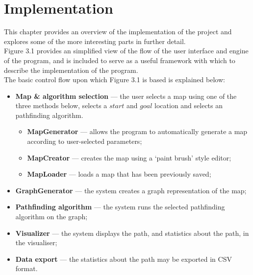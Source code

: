 \documentclass[12pt,notitlepage]{report}
\begin{document}
\chapter{Implementation}

This chapter provides an overview of the implementation of the project and explores some of the more interesting parts in further detail.\\

\noindent
Figure 3.1 provides an simplified view of the flow of the user interface and engine of the program, and is included to serve as a useful framework with which to describe the implementation of the program.\\

\noindent
The basic control flow upon which Figure 3.1 is based is explained below:
\begin{itemize}
\item {\bfseries Map \& algorithm selection} --- the user selects a map using one of the three methods below, selects a $start$ and $goal$ location and selects an pathfinding algorithm.
  \begin{itemize}
  \item {\bfseries MapGenerator} --- allows the program to automatically generate a map according to user-selected parameters;
  \item {\bfseries MapCreator} --- creates the map using a `paint brush' style editor;
  \item {\bfseries MapLoader} --- loads a map that has been previously saved;
  \end{itemize}
\item {\bfseries GraphGenerator} --- the system creates a graph representation of the map;
\item {\bfseries Pathfinding algorithm} --- the system runs the selected pathfinding algorithm on the graph;
\item {\bfseries Visualizer} --- the system displays the path, and statistics about the path, in the visualiser;
\item {\bfseries Data export} --- the statistics about the path may be exported in CSV format.
\end{itemize}
\end{document}
